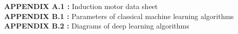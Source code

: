 \singlespacing

\textbf{APPENDIX A.1 :} Induction motor data sheet\\
\textbf{APPENDIX B.1 :} Parameters of classical machine learning algorithms\\
\textbf{APPENDIX B.2 :} Diagrams of deep learning algorithms\\





\newpage